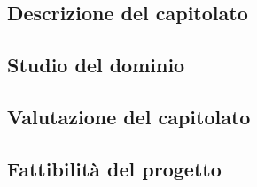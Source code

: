 \subsection{Descrizione del capitolato}

\subsection{Studio del dominio}

\subsection{Valutazione del capitolato}

\subsection{Fattibilità del progetto}


